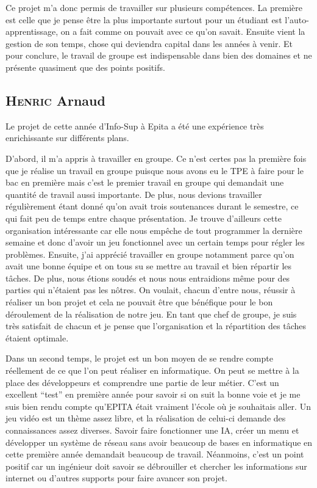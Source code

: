 \documentclass[a4paper, 12pt]{article}
\begin{document}
	\medbreak
\par Ce projet m’a donc permis de travailler sur plusieurs compétences. La première est celle que je pense être la plus importante surtout pour un étudiant est l’auto-apprentissage, on a fait comme on pouvait avec ce qu’on savait. Ensuite vient la gestion de son temps, chose qui deviendra capital dans les années à venir. Et pour conclure, le travail de groupe est indispensable dans bien des domaines et ne présente quasiment que des points positifs.

	\subsection{\textsc{Henric} Arnaud}
	
	Le projet de cette année d’Info-Sup à Epita a été une expérience très enrichissante sur différents plans.
\medbreak
\par D’abord, il m’a appris à travailler en groupe. Ce n’est certes pas la première fois que je réalise un travail en groupe puisque nous avons eu le TPE à faire pour le bac en première mais c’est le premier travail en groupe qui demandait une quantité de travail aussi importante. De plus, nous devions travailler régulièrement étant donné qu’on avait trois soutenances durant le semestre, ce qui fait peu de temps entre chaque présentation. Je trouve d’ailleurs cette organisation intéressante car elle nous empêche de tout programmer la dernière semaine et donc d’avoir un jeu fonctionnel avec un certain temps pour régler les problèmes. Ensuite, j’ai apprécié travailler en groupe notamment parce qu’on avait une bonne équipe et on tous su se mettre au travail et bien répartir les tâches. De plus, nous étions soudés et nous nous entraidions même pour des parties qui n’étaient pas les n\^otres. On voulait, chacun d’entre nous, réussir à réaliser un bon projet et cela ne pouvait être que bénéfique pour le bon déroulement de la réalisation de notre jeu. En tant que chef de groupe, je suis très satisfait de chacun et je pense que l’organisation et la répartition des tâches étaient optimale.
\medbreak
\par Dans un second temps, le projet est un bon moyen de se rendre compte réellement de ce que l’on peut réaliser en informatique. On peut se mettre à la place des développeurs et comprendre une partie de leur métier. C’est un excellent “test” en première année pour savoir si on suit la bonne voie et je me suis bien rendu compte qu’EPITA était vraiment l’école où je souhaitais aller. Un jeu vidéo est un thème assez libre, et la réalisation de celui-ci demande des connaissances assez diverses. Savoir faire fonctionner une IA, créer un menu et développer un système de réseau sans avoir beaucoup de bases en informatique en cette première année demandait beaucoup de travail. Néanmoins, c’est un point positif car un ingénieur doit savoir se débrouiller et chercher les informations sur internet ou d’autres supports pour faire avancer son projet.
\end{document}
